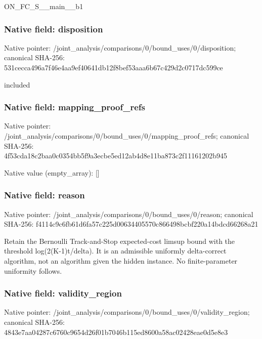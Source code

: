 \documentclass[10pt,a4paper]{article}
\begin{document}
\begingroup\raggedright\sloppy ON\_\allowbreak{}FC\_\allowbreak{}S\_\allowbreak{}\_\allowbreak{}main\_\allowbreak{}\_\allowbreak{}b1\par\endgroup

\subsubsection{Native field: disposition}
Native pointer: /joint\_\allowbreak{}analysis/comparisons/0/bound\_\allowbreak{}uses/0/disposition; canonical SHA-256: 531cecca496a7f46e4aa9ef40641db12f8bef53aaa6b67c429d2c0717dc599ce

\begingroup\raggedright\sloppy included\par\endgroup

\subsubsection{Native field: mapping\_\allowbreak{}proof\_\allowbreak{}refs}
Native pointer: /joint\_\allowbreak{}analysis/comparisons/0/bound\_\allowbreak{}uses/0/mapping\_\allowbreak{}proof\_\allowbreak{}refs; canonical SHA-256: 4f53cda18c2baa0c0354bb5f9a3ecbe5ed12ab4d8e11ba873c2f11161202b945

Native value (empty\_\allowbreak{}array): []

\subsubsection{Native field: reason}
Native pointer: /joint\_\allowbreak{}analysis/comparisons/0/bound\_\allowbreak{}uses/0/reason; canonical SHA-256: f4114c9c6fb61d6fa57c225d00634405570c866498bcbf220a14bdcd66268a21

\begingroup\raggedright\sloppy Retain the Bernoulli Track-and-Stop expected-cost limsup bound with the threshold log(2(K-1)t/\allowbreak{}delta). It is an admissible uniformly delta-correct algorithm,\allowbreak{} not an algorithm given the hidden instance. No finite-parameter uniformity follows.\par\endgroup

\subsubsection{Native field: validity\_\allowbreak{}region}
Native pointer: /joint\_\allowbreak{}analysis/comparisons/0/bound\_\allowbreak{}uses/0/validity\_\allowbreak{}region; canonical SHA-256: 4843e7aa04287c6760c9654d26f01b7046b115ed8600a58ac02428eae0d5e8e3
\end{document}
